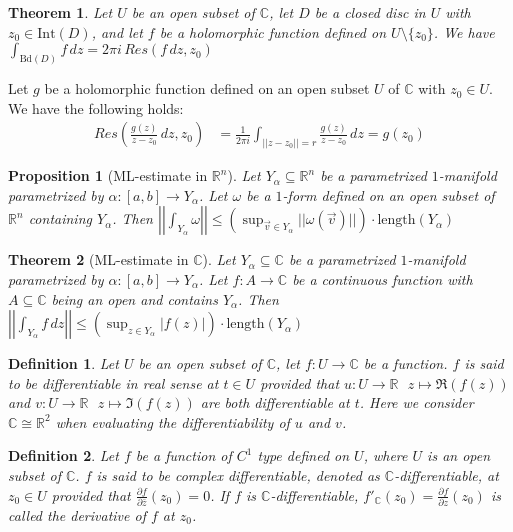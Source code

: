 \documentclass[9pt]{article}
\theoremstyle{break}
\theoremstyle{break}
\newtheorem{thm}{Theorem}[section]
\newtheorem{prop}[lem]{Proposition}
\newtheorem{defn}{Definition}[corL]
\newcommand{\R}{\mathbb{R}}
\newcommand{\Int}{\text{Int}}
\newcommand{\Bd}{\text{Bd}}
\newcommand{\Complex}{\mathbb{C}}
\newcommand{\pd}{\partial}
\begin{document}
\begin{thm}
Let $U$ be an open subset of $\Complex$, let $D$ be a closed disc in $U$ with $z_0 \in \Int(D)$, and let $f$ be a holomorphic function defined on $U \setminus \{ z_0\}$. We have $\int_{\Bd(D)} f\, dz = 2\pi i \, Res(f\, dz, z_0)$
\end{thm}


Let $g$ be a holomorphic function defined on an open subset $U$ of $\Complex$ with $z_0 \in U$.\\ 
We have the following holds:
\begin{align*}
Res\left(\frac{g(z)}{z-z_0}\, dz, z_0\right) &= \frac{1}{2\pi i}\int_{||z-z_0||=r} \frac{g(z)}{z-z_0}\, dz = g(z_0)
\end{align*}

\begin{prop}[ML-estimate in $\R^n$]
Let $Y_\alpha \subseteq \R^n$ be a parametrized $1$-manifold parametrized by $\alpha:[a,b] \to Y_\alpha$. Let $\omega$ be a $1$-form defined on an open subset of $\R^n$ containing $Y_\alpha$. Then 
$\left|\left|\int_{Y_\alpha} \omega \right|\right| \leq \left(\sup_{\vec{v}\in Y_\alpha}||\omega(\vec{v})||\right) \cdot \text{length}(Y_\alpha)$
\end{prop}

\begin{thm}[ML-estimate in $\Complex$]
Let $Y_\alpha \subseteq \Complex$ be a parametrized $1$-manifold parametrized by $\alpha:[a,b] \to Y_\alpha$. Let $f:A \to \Complex$ be a continuous function with $A\subseteq \Complex$ being an open and contains $Y_\alpha$. Then 
$\left|\left|\int_{Y_\alpha} f\, dz \right|\right| \leq \left(\sup_{z \in Y_\alpha} |f(z)|\right) \cdot \text{length}(Y_\alpha)$
\end{thm}

\begin{defn}
Let $U$ be an open subset of $\Complex$, let $f:U \to \Complex$ be a function. $f$ is said to be differentiable in real sense at $t \in U$ provided that $u:U \to \R \ \ \ z\mapsto\Re(f(z))$ and $v:U \to \R \ \ \ z\mapsto\Im(f(z))$ are both differentiable at $t$. Here we consider $\Complex \cong \R^2$ when evaluating the differentiability of $u$ and $v$.  
\end{defn}


\begin{defn}
Let $f$ be a function of $C^1$ type defined on $U$, where $U$ is an open subset of $\Complex$. $f$ is said to be complex differentiable, denoted as $\Complex$-differentiable, at $z_0\in U$ provided that $\frac{\partial f}{\partial \bar{z}}(z_0)= 0$. If $f$ is $\Complex$-differentiable, $f'_{\Complex}(z_0) = \frac{\pd f}{\pd z}(z_0)$ is called the derivative of $f$ at $z_0$. 
\end{defn}
\newpage
\end{document}
